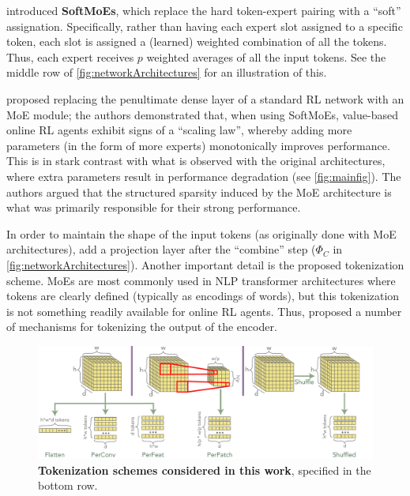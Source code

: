 \documentclass{article} %
\begin{document}
\citet{puigcerver2024from} introduced {\bf SoftMoEs}, which replace the hard token-expert pairing with a ``soft'' assignation. Specifically, rather than having each expert slot assigned to a specific token, each slot is assigned a (learned) weighted combination of all the tokens. Thus, each expert receives $p$ weighted averages of all the input tokens. See the middle row of \autoref{fig:networkArchitectures} for an illustration of this.

\citet{ceron2024mixtures} proposed replacing the penultimate dense layer of a standard RL network with an MoE module; the authors demonstrated that, when using SoftMoEs, value-based online RL agents exhibit signs of a ``scaling law'', whereby adding more parameters (in the form of more experts) monotonically improves performance. This is in stark contrast with what is observed with the original architectures, where extra parameters result in performance degradation (see \autoref{fig:mainfig}). The  authors argued that the structured sparsity induced by the MoE architecture is what was primarily responsible for their strong performance.

In order to maintain the shape of the input tokens (as originally done with MoE architectures), \citet{ceron2024mixtures} add a projection layer after the ``combine'' step ($\Phi_C$ in \autoref{fig:networkArchitectures}).
Another important detail is the proposed tokenization scheme.
MoEs are most commonly used in NLP transformer architectures where tokens are clearly defined (typically as encodings of words), but this tokenization is not something readily available for online RL agents. Thus, \citet{ceron2024mixtures} proposed a number of mechanisms for tokenizing the output of the encoder. 

\begin{figure}[!t]
    \centering
    \includegraphics[width=\textwidth]{figures/tokenizationSchemes.pdf}
    \caption{\textbf{Tokenization schemes considered in this work}, specified in the bottom row.}
    \label{fig:tokenizationSchemes}
\end{figure}
\end{document}
